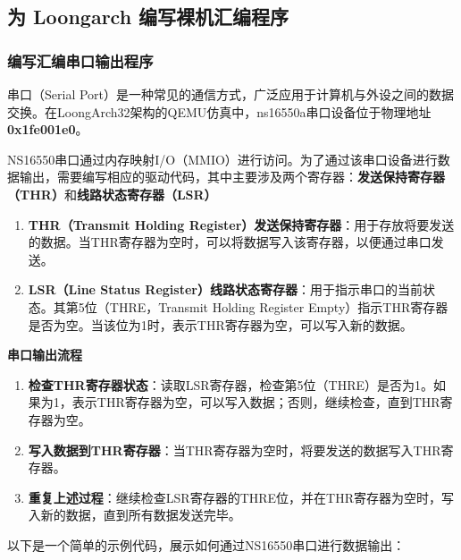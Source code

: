 \subsection{为 Loongarch 编写裸机汇编程序}\label{sec:02-software-preparation-005}

\subsubsection{编写汇编串口输出程序}\label{sec:02-software-preparation-006}

串口（Serial Port）是一种常见的通信方式，广泛应用于计算机与外设之间的数据交换。在LoongArch32架构的QEMU仿真中，ns16550a串口设备位于物理地址\textbf{0x1fe001e0}。

NS16550串口通过内存映射I/O（MMIO）进行访问。为了通过该串口设备进行数据输出，需要编写相应的驱动代码，其中主要涉及两个寄存器：\textbf{发送保持寄存器（THR）}和\textbf{线路状态寄存器（LSR）}

\begin{enumerate}
\def\labelenumi{\arabic{enumi}.}
\item
  \textbf{THR（Transmit Holding Register）发送保持寄存器}：用于存放将要发送的数据。当THR寄存器为空时，可以将数据写入该寄存器，以便通过串口发送。
\item
  \textbf{LSR（Line Status Register）线路状态寄存器}：用于指示串口的当前状态。其第5位（THRE，Transmit Holding Register Empty）指示THR寄存器是否为空。当该位为1时，表示THR寄存器为空，可以写入新的数据。
\end{enumerate}

\textbf{串口输出流程}

\begin{enumerate}
\def\labelenumi{\arabic{enumi}.}
\item
  \textbf{检查THR寄存器状态}：读取LSR寄存器，检查第5位（THRE）是否为1。如果为1，表示THR寄存器为空，可以写入数据；否则，继续检查，直到THR寄存器为空。
\item
  \textbf{写入数据到THR寄存器}：当THR寄存器为空时，将要发送的数据写入THR寄存器。
\item
  \textbf{重复上述过程}：继续检查LSR寄存器的THRE位，并在THR寄存器为空时，写入新的数据，直到所有数据发送完毕。
\end{enumerate}

以下是一个简单的示例代码，展示如何通过NS16550串口进行数据输出：

